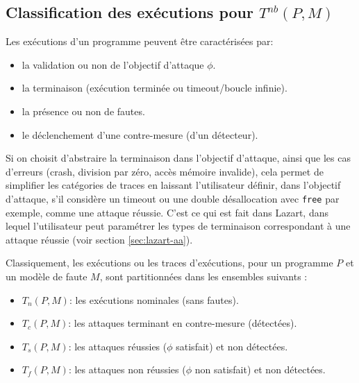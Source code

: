         \subsection{Classification des exécutions pour $T^{nb}(P, M)$}
        \label{sec:exec-classification}
    
            Les exécutions d'un programme peuvent être caractérisées par:
            \begin{itemize}
                \item la validation ou non de l'objectif d'attaque $\phi$.
                \item la terminaison (exécution terminée ou timeout/boucle infinie).
                \item la présence ou non de fautes.
                \item le déclenchement d'une contre-mesure (d'un détecteur).
            \end{itemize}
            
            Si on choisit d'abstraire la terminaison dans l'objectif d'attaque, ainsi que les cas d'erreurs (crash, division par zéro, accès mémoire invalide), cela permet de simplifier les catégories de traces en laissant l'utilisateur définir, dans l'objectif d'attaque, s'il considère un timeout ou une double désallocation avec \texttt{free} par exemple, comme une attaque réussie.
            C'est ce qui est fait dans Lazart, dans lequel l'utilisateur peut paramétrer les types de terminaison correspondant à une attaque réussie (voir section \ref{sec:lazart-aa}).
            
            Classiquement, les exécutions ou les traces d'exécutions, pour un programme $P$ et un modèle de faute $M$, sont partitionnées dans les ensembles suivants :
            \begin{itemize}
                \item $T_n(P, M)$: les exécutions nominales (sans fautes).
                \item $T_c(P, M)$: les attaques terminant en contre-mesure (détectées).
                \item $T_s(P, M)$: les attaques réussies ($\phi$ satisfait) et non détectées.
                \item $T_f(P, M)$: les attaques non réussies ($\phi$ non satisfait) et non détectées.
            \end{itemize}
            
